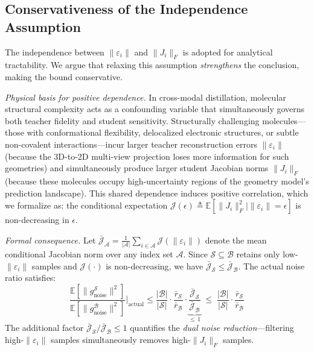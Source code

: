 \subsection{Conservativeness of the Independence Assumption}

The independence between $\|\varepsilon_i\|$ and $\|J_i\|_F$ is adopted for analytical tractability. We argue that relaxing this assumption \emph{strengthens} the conclusion, making the bound conservative.

\emph{Physical basis for positive dependence.} In cross-modal distillation, molecular structural complexity acts as a confounding variable that simultaneously governs both teacher fidelity and student sensitivity. Structurally challenging molecules---those with conformational flexibility, delocalized electronic structures, or subtle non-covalent interactions---incur larger teacher reconstruction errors $\|\varepsilon_i\|$ (because the 3D-to-2D multi-view projection loses more information for such geometries) and simultaneously produce larger student Jacobian norms $\|J_i\|_F$ (because these molecules occupy high-uncertainty regions of the geometry model's prediction landscape). This shared dependence induces positive correlation, which we formalize as: the conditional expectation $\mathcal{J}(\epsilon) \triangleq \mathbb{E}[\|J_i\|_F^2 \mid \|\varepsilon_i\| = \epsilon]$ is non-decreasing in $\epsilon$.

\emph{Formal consequence.} Let $\bar{\mathcal{J}}_{\mathcal{A}} = \frac{1}{|\mathcal{A}|}\sum_{i \in \mathcal{A}} \mathcal{J}(\|\varepsilon_i\|)$ denote the mean conditional Jacobian norm over any index set $\mathcal{A}$. Since $\mathcal{S} \subseteq \mathcal{B}$ retains only low-$\|\varepsilon_i\|$ samples and $\mathcal{J}(\cdot)$ is non-decreasing, we have $\bar{\mathcal{J}}_{\mathcal{S}} \leq \bar{\mathcal{J}}_{\mathcal{B}}$. The actual noise ratio satisfies:
\begin{equation}
    \frac{\mathbb{E}[\|g^{\mathcal{S}}_{\mathrm{noise}}\|^2]}{\mathbb{E}[\|g^{\mathcal{B}}_{\mathrm{noise}}\|^2]}\bigg|_{\mathrm{actual}} \leq \frac{|\mathcal{B}|}{|\mathcal{S}|}\cdot\frac{\bar{r}_{\mathcal{S}}}{\bar{r}_{\mathcal{B}}} \cdot \underbrace{\frac{\bar{\mathcal{J}}_{\mathcal{S}}}{\bar{\mathcal{J}}_{\mathcal{B}}}}_{\leq\, 1} \;\leq\; \frac{|\mathcal{B}|}{|\mathcal{S}|}\cdot\frac{\bar{r}_{\mathcal{S}}}{\bar{r}_{\mathcal{B}}}
\end{equation}
The additional factor $\bar{\mathcal{J}}_{\mathcal{S}}/\bar{\mathcal{J}}_{\mathcal{B}} \leq 1$ quantifies the \emph{dual noise reduction}---filtering high-$\|\varepsilon_i\|$ samples simultaneously removes high-$\|J_i\|_F$ samples.

